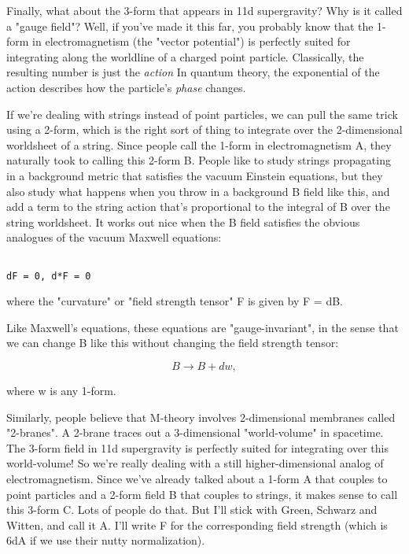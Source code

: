 Finally, what about the 3-form that appears in 11d supergravity?  Why is
it called a "gauge field"?  Well, if you've made it this far,
you probably know that the 1-form in electromagnetism (the "vector
potential") is perfectly suited for integrating along the worldline
of a charged point particle.  Classically, the resulting number is just
the \emph{action}  In quantum theory, the exponential of the action describes
how the particle's \emph{phase} changes.
 
If we're dealing with strings instead of point particles, we can pull
the same trick using a 2-form, which is the right sort of thing to
integrate over the 2-dimensional worldsheet of a string.  Since people
call the 1-form in electromagnetism A, they naturally took to calling
this 2-form B.  People like to study strings propagating in a background
metric that satisfies the vacuum Einstein equations, but they also study
what happens when you throw in a background B field like this, and add a
term to the string action that's proportional to the integral of B over
the string worldsheet.  It works out nice when the B field satisfies the
obvious analogues of the vacuum Maxwell equations:
 

\begin{verbatim}

dF = 0, d*F = 0 
\end{verbatim}
    
where the "curvature" or "field strength tensor" F
is given by F = dB.
 
Like Maxwell's equations, these equations are
"gauge-invariant", in the sense that we can change B like this
without changing the field strength tensor:
 

$$

B \to  B + dw, 
$$
    
where w is any 1-form.    
 
Similarly, people believe that M-theory involves 2-dimensional membranes
called "2-branes".  A 2-brane traces out a 3-dimensional
"world-volume" in spacetime.  The 3-form field in 11d
supergravity is perfectly suited for integrating over this world-volume!
So we're really dealing with a still higher-dimensional analog of
electromagnetism.  Since we've already talked about a 1-form A that
couples to point particles and a 2-form field B that couples to strings,
it makes sense to call this 3-form C.  Lots of people do that.  But I'll
stick with Green, Schwarz and Witten, and call it A.  I'll write F for
the corresponding field strength (which is 6dA if we use their nutty
normalization).
 
